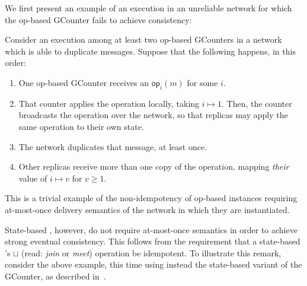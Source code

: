 We first present an example of an execution in an unreliable network for which
the op-based GCounter fails to achieve consistency:
\begin{example}
  Consider an execution among at least two op-based GCounters in a network
  which is able to duplicate messages. Suppose that the following happens, in
  this order:
  \begin{enumerate}
    \item One op-based GCounter receives an $\mathsf{op}_i(m)$ for some $i$.
    \item That counter applies the operation locally, taking $i \mapsto 1$. Then,
      the counter broadcasts the operation over the network, so that replicas may
      apply the same operation to their own state.
    \item The network duplicates that message, at least once.
    \item Other replicas receive more than one copy of the operation, mapping
      \textit{their} value of $i \mapsto v$ for $v \ge 1$.
  \end{enumerate}
  This is a trivial example of the non-idempotency of op-based \CRDT instances
  requiring at-most-once delivery semantics of the network in which they are
  instantiated.
\end{example}

State-based \CRDTs, however, do not require at-most-once semantics in order to
achieve strong eventual consistency. This follows from the requirement that a
state-based \CRDT's $\sqcup$ (read: \textit{join} or \textit{meet}) operation be
idempotent. To illustrate this remark, consider the above example, this time
using instead the state-based variant of the GCounter, as described
in~\citep{almedia18}.

